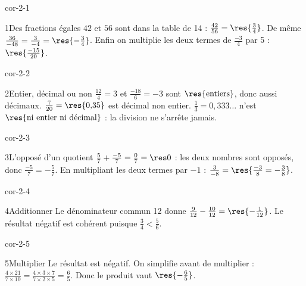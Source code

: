 \clearpage\pagestyle{otMain}\setlength{\otBlocEspacement}{2.5mm}\fontsize{11}{15}\selectfont{}
\begin{blocLivre}{cor-2-1}\begin{corrige}{1}{Des fractions égales}
$42$ et $56$ sont dans la table de 14 : $\frac{42}{56}=\res{\frac34}$. De même $\frac{36}{-48}=\frac{3}{-4}=\res{-\frac34}$. Enfin on multiplie les deux termes de $\frac{-3}4$ par 5 : $\res{\frac{-15}{20}}$.
\end{corrige}\end{blocLivre}
\begin{blocLivre}{cor-2-2}\begin{corrige}{2}{Entier, décimal ou non}
$\frac{12}4=3$ et $\frac{-18}6=-3$ sont $\res{\text{entiers}}$, donc aussi décimaux. $\frac7{20}=\res{0{,}35}$ est décimal non entier. $\frac13=0{,}333\ldots$ n’est $\res{\text{ni entier ni décimal}}$ : la division ne s’arrête jamais.
\end{corrige}\end{blocLivre}
\begin{blocLivre}{cor-2-3}\begin{corrige}{3}{L’opposé d’un quotient}
$\frac57+\frac{-5}7=\frac07=\res0$ : les deux nombres sont opposés, donc $\frac{-5}7=-\frac57$. En multipliant les deux termes par $-1$ : $\frac3{-8}=\res{\frac{-3}8=-\frac38}$.
\end{corrige}\end{blocLivre}
\begin{blocLivre}{cor-2-4}\begin{corrige}{4}{Additionner}
Le dénominateur commun 12 donne $\frac9{12}-\frac{10}{12}=\res{-\frac1{12}}$. Le résultat négatif est cohérent puisque $\frac34<\frac56$.
\end{corrige}\end{blocLivre}
\begin{blocLivre}{cor-2-5}\begin{corrige}{5}{Multiplier}
Le résultat est négatif. On simplifie avant de multiplier : $\frac{4\times21}{7\times10}=\frac{4\times3\times7}{7\times2\times5}=\frac65$. Donc le produit vaut $\res{-\frac65}$.
\end{corrige}\end{blocLivre}
